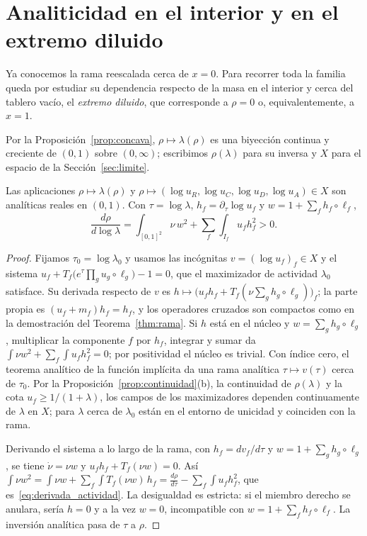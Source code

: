 \section{Analiticidad en el interior y en el extremo diluido}\label{sec:analiticidad}

Ya conocemos la rama reescalada cerca de $x=0$. Para recorrer toda la familia
queda por estudiar su dependencia respecto de la masa en el interior y cerca del
tablero vacío, el \emph{extremo diluido}, que corresponde a $\rho=0$ o, equivalentemente, a $x=1$.

Por la Proposición~\ref{prop:concava}, $\rho\mapsto\lambda(\rho)$ es una biyección continua y
creciente de $(0,1)$ sobre $(0,\infty)$; escribimos $\rho(\lambda)$ para su inversa y $X$ para el
espacio de la Sección~\ref{sec:limite}.

\begin{proposicion}[Interior]\label{prop:interior}
Las aplicaciones $\rho\mapsto\lambda(\rho)$ y $\rho\mapsto(\log u_R,\log u_C,\log u_D,\log u_A)\in X$
son analíticas reales en $(0,1)$. Con $\tau=\log\lambda$, $h_f=\partial_\tau\log u_f$ y
$w=1+\sum_fh_f\circ\ell_f$,
\begin{equation}\label{eq:derivada_actividad}
 \frac{d\rho}{d\log\lambda}=\int_{[0,1]^2}\nu\,w^2+\sum_f\int_{I_f}u_fh_f^2>0 .
\end{equation}
\end{proposicion}

\begin{proof}
Fijamos $\tau_0=\log\lambda_0$ y usamos las incógnitas $v=(\log u_f)_f\in X$ y el sistema
$u_f+T_f\bigl(e^\tau\prod_gu_g\circ\ell_g\bigr)-1=0$, que el maximizador de actividad $\lambda_0$
satisface. Su derivada respecto de $v$ es $h\mapsto\bigl(u_fh_f+T_f(\nu\sum_gh_g\circ\ell_g)\bigr)_f$; la
parte propia es $(u_f+m_f)h_f=h_f$, y los operadores cruzados son compactos como en la demostración
del Teorema~\ref{thm:rama}. Si $h$ está en el núcleo y $w=\sum_gh_g\circ\ell_g$, multiplicar la
componente $f$ por $h_f$, integrar y sumar da $\int\nu w^2+\sum_f\int u_fh_f^2=0$; por positividad el
núcleo es trivial. Con índice cero, el teorema analítico de la función implícita da una rama analítica
$\tau\mapsto v(\tau)$ cerca de $\tau_0$. Por la Proposición~\ref{prop:continuidad}(b), la continuidad de
$\rho(\lambda)$ y la cota $u_f\ge1/(1+\lambda)$, los campos de los maximizadores dependen
continuamente de $\lambda$ en $X$; para $\lambda$ cerca de $\lambda_0$ están en el entorno de unicidad
y coinciden con la rama.

Derivando el sistema a lo largo de la rama, con $h_f=dv_f/d\tau$ y $w=1+\sum_gh_g\circ\ell_g$, se tiene
$\dot\nu=\nu w$ y $u_fh_f+T_f(\nu w)=0$. Así
$\int\nu w^2=\int\nu w+\sum_f\int T_f(\nu w)\,h_f=\frac{d\rho}{d\tau}-\sum_f\int u_fh_f^2$, que
es~\eqref{eq:derivada_actividad}. La desigualdad es estricta: si el miembro derecho se anulara, sería $h=0$ y a la vez
$w=0$, incompatible con $w=1+\sum_fh_f\circ\ell_f$. La inversión analítica pasa de $\tau$ a $\rho$.
\end{proof}

